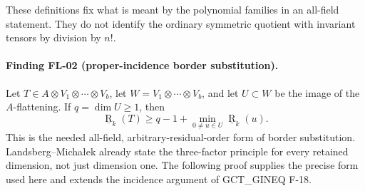 These definitions fix what is meant by the polynomial families in
an all-field statement. They do not identify the ordinary symmetric
quotient with invariant tensors by division by $n!$.

\paragraph{Finding FL-02 (proper-incidence border substitution).}
Let $T\in A\otimes V_1\otimes\cdots\otimes V_b$, let
$W=V_1\otimes\cdots\otimes V_b$, and let $U\subset W$ be the
image of the $A$-flattening. If $q=\dim U\geq1$, then
\begin{equation}\label{eq:fields-substitution}
 \underline{\operatorname R}_k(T)
 \geq q-1+\min_{0\ne u\in U}\underline{\operatorname R}_k(u).
\end{equation}
This is the needed all-field, arbitrary-residual-order form of
border substitution. Landsberg--Micha\l ek
\cite[Proposition~2.3, p.~3]{LM2018} already state the three-factor
principle for every retained dimension, not just dimension one.
The following proof supplies the precise form used here and extends
the incidence argument of GCT\_GINEQ F-18.

